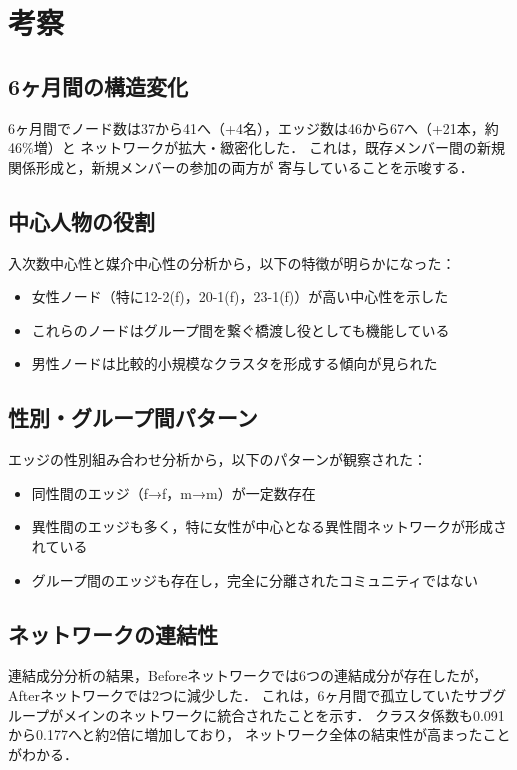 \section{考察}

\subsection{6ヶ月間の構造変化}

6ヶ月間でノード数は37から41へ（+4名），エッジ数は46から67へ（+21本，約46\%増）と
ネットワークが拡大・緻密化した．
これは，既存メンバー間の新規関係形成と，新規メンバーの参加の両方が
寄与していることを示唆する．

\subsection{中心人物の役割}

入次数中心性と媒介中心性の分析から，以下の特徴が明らかになった：

\begin{itemize}
  \item 女性ノード（特に12-2(f)，20-1(f)，23-1(f)）が高い中心性を示した
  \item これらのノードはグループ間を繋ぐ橋渡し役としても機能している
  \item 男性ノードは比較的小規模なクラスタを形成する傾向が見られた
\end{itemize}

\subsection{性別・グループ間パターン}

エッジの性別組み合わせ分析から，以下のパターンが観察された：

\begin{itemize}
  \item 同性間のエッジ（f→f，m→m）が一定数存在
  \item 異性間のエッジも多く，特に女性が中心となる異性間ネットワークが形成されている
  \item グループ間のエッジも存在し，完全に分離されたコミュニティではない
\end{itemize}

\subsection{ネットワークの連結性}

連結成分分析の結果，Beforeネットワークでは6つの連結成分が存在したが，
Afterネットワークでは2つに減少した．
これは，6ヶ月間で孤立していたサブグループがメインのネットワークに統合されたことを示す．
クラスタ係数も0.091から0.177へと約2倍に増加しており，
ネットワーク全体の結束性が高まったことがわかる．

